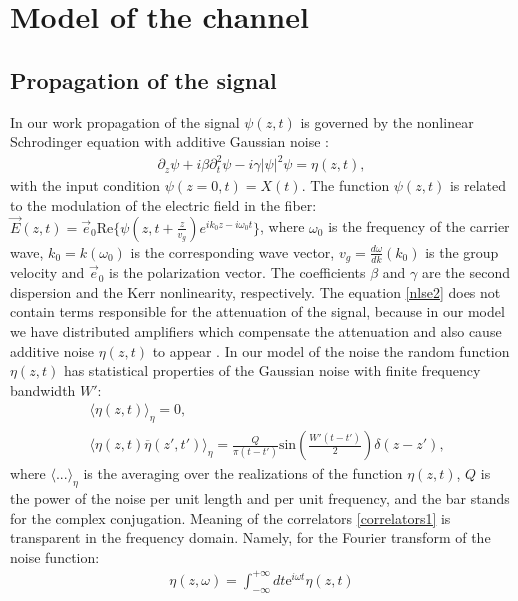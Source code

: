 \documentclass{article}
\begin{document}
\section{Model of the channel}
\subsection{Propagation of the signal}
In our work propagation of the signal $\psi(z,t)$ is governed by the nonlinear Schrodinger equation with additive Gaussian noise \cite{haus1991quantum, agrawal2000nonlinear, menyuk1999application, kodama1985optical}: 
\begin{align}\label{nlse2}
    \partial_{z}\psi + i\beta\partial^2_{t}\psi - i\gamma|\psi|^2\psi = \eta(z,t), 
\end{align}
with the input condition $\psi(z=0,t) = X(t)$. The function $\psi(z,t)$ is related to the modulation of the electric field in the fiber: $\vec{E}(z,t)=\vec{e}_{0}\textrm{Re}\{\psi(z,t+\frac{z}{v_{g}})e^{ik_{0}z-i\omega_{0}t}\}$, where $\omega_{0}$ is the frequency of the carrier wave, $k_{0} = k(\omega_{0})$ is the corresponding wave vector, $v_{g}=\frac{d\omega}{dk}(k_{0})$ is the group velocity and $\vec{e}_{0}$ is the polarization vector. The coefficients $\beta$ and $\gamma$ are the second dispersion and the Kerr nonlinearity, respectively. The equation \eqref{nlse2} does not contain terms responsible for the attenuation of the signal, because in our model we have distributed amplifiers which compensate the attenuation and also cause additive noise $\eta(z,t)$ to appear \cite{haus1991quantum}. In our model of the noise the random function $\eta(z,t)$ has statistical properties of the Gaussian noise with finite frequency bandwidth $W'$:
\begin{align}\label{correlators1}
    &\langle\eta(z,t)\rangle_{\eta}=0,\nonumber\\
    &\langle\eta(z,t)\overline{\eta}(z',t')\rangle_{\eta}=\frac{Q}{\pi (t-t')}\textrm{sin}\left(\frac{W'(t-t')}{2}\right)\delta(z-z'),
\end{align}
where $\langle ... \rangle_{\eta}$ is the averaging over the realizations of the function $\eta(z,t)$, $Q$ is the power of the noise per unit length and per unit frequency, and the bar stands for the complex conjugation. Meaning of the correlators \eqref{correlators1} is transparent in the frequency domain. Namely, for the Fourier transform of the noise function:
\begin{eqnarray}
    \eta(z,\omega) = \int_{-\infty}^{+\infty} dt \textrm{e}^{i\omega t}\eta(z,t)
\end{eqnarray}
\end{document}
